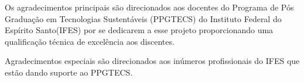 \begin{agradecimentos}
Os agradecimentos principais são direcionados aos docentes do Programa de Pós Graduação em Tecnologias Sustentáveis (PPGTECS) do Instituto Federal do Espírito Santo(IFES) por se dedicarem a esse projeto proporcionando uma qualificação técnica de excelência aos discentes.

Agradecimentos especiais são direcionados aos inúmeros profissionais do IFES que estão dando suporte ao PPGTECS.

\end{agradecimentos}
